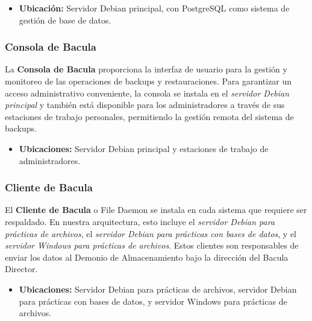 \begin{itemize}
    \item \textbf{Ubicación:} Servidor Debian principal, con PostgreSQL como sistema de gestión de base de datos.
\end{itemize}

\subsubsection{Consola de Bacula}

La \textbf{Consola de Bacula} proporciona la interfaz de usuario para la gestión y monitoreo de las operaciones de backups y restauraciones. Para garantizar un acceso administrativo conveniente, la consola se instala en el \textit{servidor Debian principal} y también está disponible para los administradores a través de sus estaciones de trabajo personales, permitiendo la gestión remota del sistema de backups.

\begin{itemize}
    \item \textbf{Ubicaciones:} Servidor Debian principal y estaciones de trabajo de administradores.
\end{itemize}

\subsubsection{Cliente de Bacula}

El \textbf{Cliente de Bacula} o File Daemon se instala en cada sistema que requiere ser respaldado. En nuestra arquitectura, esto incluye el \textit{servidor Debian para prácticas de archivos}, el \textit{servidor Debian para prácticas con bases de datos}, y el \textit{servidor Windows para prácticas de archivos}. Estos clientes son responsables de enviar los datos al Demonio de Almacenamiento bajo la dirección del Bacula Director.

\begin{itemize}
    \item \textbf{Ubicaciones:} Servidor Debian para prácticas de archivos, servidor Debian para prácticas con bases de datos, y servidor Windows para prácticas de archivos.
\end{itemize}


















